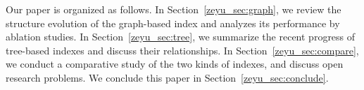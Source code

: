 \documentclass[11pt]{article}
\begin{document}

Our paper is organized as follows.
In Section~\ref{zeyu_sec:graph}, we review the structure evolution of the graph-based index and analyzes its performance by ablation studies.
In Section~\ref{zeyu_sec:tree}, we summarize the recent progress of tree-based indexes and discuss their relationships.
In Section~\ref{zeyu_sec:compare}, we conduct a comparative study of the two kinds of indexes, %
and discuss open research problems.
We conclude this paper in Section~\ref{zeyu_sec:conclude}.






\end{document}
